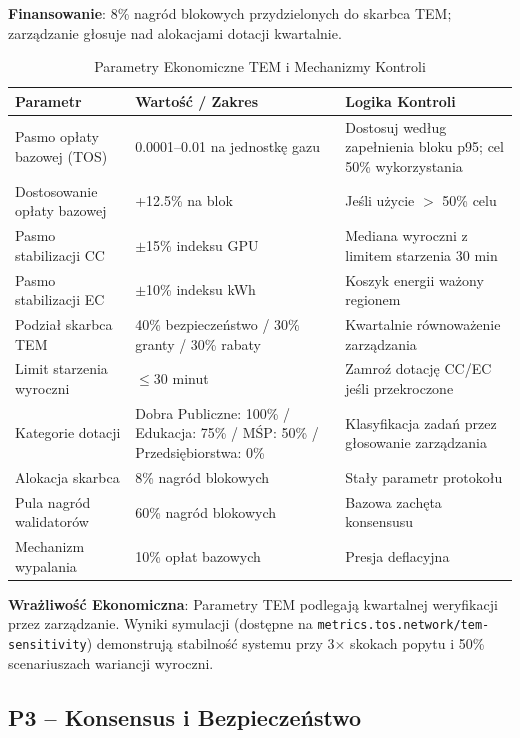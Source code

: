 \documentclass[11pt]{article}
\begin{document}
\textbf{Finansowanie}: 8\% nagród blokowych przydzielonych do skarbca TEM; zarządzanie głosuje nad alokacjami dotacji kwartalnie.

\begin{table}[H]
\centering
\caption{Parametry Ekonomiczne TEM i Mechanizmy Kontroli}
\label{tab:tem-parameters}
\begin{tabular}{@{}p{}p{}p{}@{}}
\toprule
\textbf{Parametr} & \textbf{Wartość / Zakres} & \textbf{Logika Kontroli} \\ \midrule
Pasmo opłaty bazowej (TOS) & 0.0001--0.01 na jednostkę gazu & Dostosuj według zapełnienia bloku p95; cel 50\% wykorzystania \\
Dostosowanie opłaty bazowej & +12.5\% na blok & Jeśli użycie $>$ 50\% celu \\
Pasmo stabilizacji CC & $\pm$15\% indeksu GPU & Mediana wyroczni z limitem starzenia 30 min \\
Pasmo stabilizacji EC & $\pm$10\% indeksu kWh & Koszyk energii ważony regionem \\
Podział skarbca TEM & 40\% bezpieczeństwo / 30\% granty / 30\% rabaty & Kwartalnie równoważenie zarządzania \\
Limit starzenia wyroczni & $\le$30 minut & Zamroź dotację CC/EC jeśli przekroczone \\
Kategorie dotacji & Dobra Publiczne: 100\% / Edukacja: 75\% / MŚP: 50\% / Przedsiębiorstwa: 0\% & Klasyfikacja zadań przez głosowanie zarządzania \\
Alokacja skarbca & 8\% nagród blokowych & Stały parametr protokołu \\
Pula nagród walidatorów & 60\% nagród blokowych & Bazowa zachęta konsensusu \\
Mechanizm wypalania & 10\% opłat bazowych & Presja deflacyjna \\
\bottomrule
\end{tabular}
\end{table}

\textbf{Wrażliwość Ekonomiczna}: Parametry TEM podlegają kwartalnej weryfikacji przez zarządzanie. Wyniki symulacji (dostępne na \texttt{metrics.tos.network/tem-sensitivity}) demonstrują stabilność systemu przy 3$\times$ skokach popytu i 50\% scenariuszach wariancji wyroczni.

\subsection{P3 -- Konsensus i Bezpieczeństwo}
\label{sec:pillar-consensus}
\end{document}
